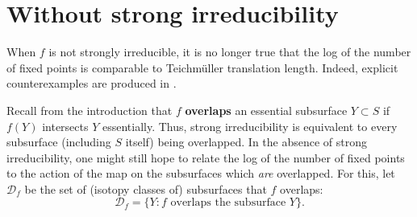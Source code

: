 \documentclass[11pt,letterpaper]{amsart}
\newcommand{\mc}{\mathcal}
\newcommand{\mr}{\mathring}
\newcommand{\teich}{\mathcal T}
\newcommand{\Fix}{\operatorname{Fix}}
\numberwithin{equation}{section}
\theoremstyle{definition}
\newcommand{\C}{\mathcal{C}}
\newcommand{\define}[1]{\textbf{#1}}
\newcommand{\sam}[1]{{\color{blue}{#1}}}
\begin{document}
%    
%    
%    
%    


\section{Without strong irreducibility}\label{Sec:WithoutStronglyIrreducible}


When $f$ is not strongly irreducible, it is no longer true that the log of the number of fixed points is comparable to Teichm{\"u}ller translation length. Indeed, explicit counterexamples are produced 
in .


Recall from the introduction that $f$ \define{overlaps} an essential subsurface $Y \subset S$ if $f(Y)$ intersects $Y$ essentially. 
Thus, strong irreducibility is equivalent to every subsurface (including $S$ itself) being overlapped. In the absence of strong irreducibility, one might still hope to relate the log of the number of fixed points to the action of the map on the subsurfaces which \emph{are} overlapped. For this, let $\mc D_f$ be the set of (isotopy classes of) subsurfaces that $f$ overlaps:
\[
\mc D_f = \{Y : f \text{ overlaps the subsurface } Y \} .
\]
 
\end{document}
